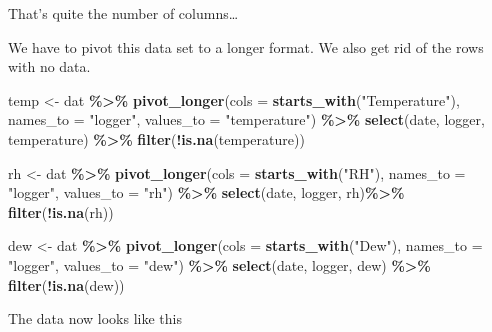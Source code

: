 \documentclass[]{article}
\newenvironment{Shaded}{\begin{snugshade}}{\end{snugshade}}
\newcommand{\DataTypeTok}[1]{\textcolor[rgb]{0.13,0.29,0.53}{#1}}
\newcommand{\KeywordTok}[1]{\textcolor[rgb]{0.13,0.29,0.53}{\textbf{#1}}}
\newcommand{\NormalTok}[1]{#1}
\newcommand{\OperatorTok}[1]{\textcolor[rgb]{0.81,0.36,0.00}{\textbf{#1}}}
\newcommand{\StringTok}[1]{\textcolor[rgb]{0.31,0.60,0.02}{#1}}
\begin{document}
That's quite the number of columns\ldots{}

We have to pivot this data set to a longer format. We also get rid of
the rows with no data.

\begin{Shaded}
\begin{Highlighting}[]
\NormalTok{temp <{-}}\StringTok{ }\NormalTok{dat }\OperatorTok{\%>\%}\StringTok{ }
\StringTok{  }\KeywordTok{pivot\_longer}\NormalTok{(}\DataTypeTok{cols =} \KeywordTok{starts\_with}\NormalTok{(}\StringTok{"Temperature"}\NormalTok{),}
               \DataTypeTok{names\_to =} \StringTok{"logger"}\NormalTok{,}
               \DataTypeTok{values\_to =} \StringTok{"temperature"}\NormalTok{) }\OperatorTok{\%>\%}\StringTok{ }
\StringTok{  }\KeywordTok{select}\NormalTok{(date,}
\NormalTok{         logger,}
\NormalTok{         temperature) }\OperatorTok{\%>\%}\StringTok{ }
\StringTok{  }\KeywordTok{filter}\NormalTok{(}\OperatorTok{!}\KeywordTok{is.na}\NormalTok{(temperature))}

\NormalTok{rh <{-}}\StringTok{ }\NormalTok{dat }\OperatorTok{\%>\%}\StringTok{ }
\StringTok{  }\KeywordTok{pivot\_longer}\NormalTok{(}\DataTypeTok{cols =} \KeywordTok{starts\_with}\NormalTok{(}\StringTok{"RH"}\NormalTok{),}
               \DataTypeTok{names\_to =} \StringTok{"logger"}\NormalTok{,}
               \DataTypeTok{values\_to =} \StringTok{"rh"}\NormalTok{) }\OperatorTok{\%>\%}\StringTok{ }
\StringTok{  }\KeywordTok{select}\NormalTok{(date,}
\NormalTok{         logger,}
\NormalTok{         rh)}\OperatorTok{\%>\%}\StringTok{ }
\StringTok{  }\KeywordTok{filter}\NormalTok{(}\OperatorTok{!}\KeywordTok{is.na}\NormalTok{(rh))}

\NormalTok{dew  <{-}}\StringTok{ }\NormalTok{dat }\OperatorTok{\%>\%}\StringTok{ }
\StringTok{  }\KeywordTok{pivot\_longer}\NormalTok{(}\DataTypeTok{cols =} \KeywordTok{starts\_with}\NormalTok{(}\StringTok{"Dew"}\NormalTok{),}
               \DataTypeTok{names\_to =} \StringTok{"logger"}\NormalTok{,}
               \DataTypeTok{values\_to =} \StringTok{"dew"}\NormalTok{) }\OperatorTok{\%>\%}\StringTok{ }
\StringTok{  }\KeywordTok{select}\NormalTok{(date,}
\NormalTok{         logger,}
\NormalTok{         dew) }\OperatorTok{\%>\%}\StringTok{ }
\StringTok{  }\KeywordTok{filter}\NormalTok{(}\OperatorTok{!}\KeywordTok{is.na}\NormalTok{(dew))}
\end{Highlighting}
\end{Shaded}

The data now looks like this
\end{document}
